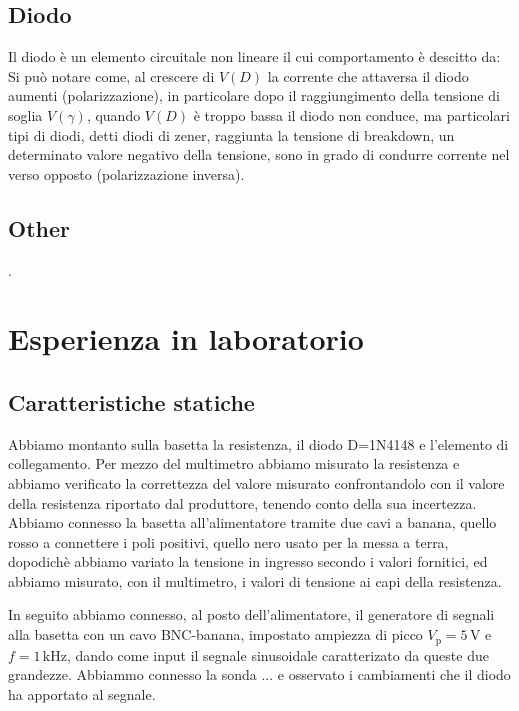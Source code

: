 \documentclass[a4paper]{article}
\begin{document}
		\subsection{Diodo}
			Il diodo è un elemento circuitale non lineare il cui comportamento è descitto da:
			\newline
			Si può notare come, al crescere di $ V(D) $ la corrente che attaversa il diodo aumenti (polarizzazione), in particolare dopo il raggiungimento della tensione di soglia $ V(\gamma) $, quando $ V(D) $ è troppo bassa il diodo non conduce, ma particolari tipi di diodi, detti diodi di zener, raggiunta la tensione di breakdown, un determinato valore negativo della tensione, sono in grado di condurre corrente nel verso opposto (polarizzazione inversa).
		\subsection{Other}
			.
	\section{Esperienza in laboratorio}
		\subsection{Caratteristiche statiche}
			Abbiamo montanto sulla basetta la resistenza, il diodo D=1N4148 e l'elemento di collegamento.
			Per mezzo del multimetro abbiamo misurato la resistenza e abbiamo verificato la correttezza del valore misurato confrontandolo con il valore della resistenza riportato dal produttore, tenendo conto della sua incertezza.
			Abbiamo connesso la basetta all'alimentatore tramite due cavi a banana, quello rosso a connettere i poli positivi, quello nero usato per la messa a terra, dopodichè abbiamo variato la tensione in ingresso secondo i valori fornitici, ed abbiamo misurato, con il multimetro, i valori di tensione ai capi della resistenza.
			
			In seguito abbiamo connesso, al posto dell'alimentatore, il generatore di segnali alla basetta con un cavo BNC-banana, impostato ampiezza di picco $ V_{\mathrm{p}} = 5 \, \mathrm{V} $ e $ f = 1 \, \mathrm{kHz} $, dando come input il segnale sinusoidale caratterizato da queste due grandezze.
			Abbiammo connesso la sonda ... e osservato i cambiamenti che il diodo ha apportato al segnale.
			
\end{document}

